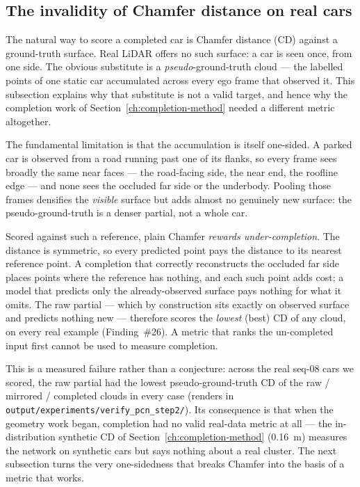 \subsection{The invalidity of Chamfer distance on real cars}
\label{sec:chamfer-invalid}

The natural way to score a completed car is Chamfer distance (CD) against a
ground-truth surface. Real LiDAR offers no such surface: a car is seen once, from
one side. The obvious substitute is a \emph{pseudo}-ground-truth cloud --- the
labelled points of one static car accumulated across every ego frame that
observed it. This subsection explains why that substitute is not a valid target,
and hence why the completion work of Section~\ref{ch:completion-method} needed a different metric
altogether.

The fundamental limitation is that the accumulation is itself one-sided. A parked car is
observed from a road running past one of its flanks, so every frame sees broadly
the same near faces --- the road-facing side, the near end, the roofline edge ---
and none sees the occluded far side or the underbody. Pooling those frames
densifies the \emph{visible} surface but adds almost no genuinely new surface: the
pseudo-ground-truth is a denser partial, not a whole car.

Scored against such a reference, plain Chamfer \emph{rewards under-completion}.
The distance is symmetric, so every predicted point pays the distance to its
nearest reference point. A completion that correctly reconstructs the occluded
far side places points where the reference has nothing, and each such point adds
cost; a model that predicts only the already-observed surface pays nothing for
what it omits. The raw partial --- which by construction sits exactly on observed
surface and predicts nothing new --- therefore scores the \emph{lowest} (best) CD
of any cloud, on every real example (Finding~\#26). A metric that ranks the
un-completed input first cannot be used to measure completion.

This is a measured failure rather than a conjecture: across the real seq-08 cars
we scored, the raw partial had the lowest pseudo-ground-truth CD of the raw /
mirrored / completed clouds in every case (renders in
\texttt{output/experiments/verify\_pcn\_step2/}). Its consequence is that when the geometry work
began, completion had no valid real-data metric at all --- the in-distribution
synthetic CD of Section~\ref{ch:completion-method} (\SI{0.16}{\meter}) measures the network on synthetic
cars but says nothing about a real cluster. The next subsection turns the very
one-sidedness that breaks Chamfer into the basis of a metric that works.

